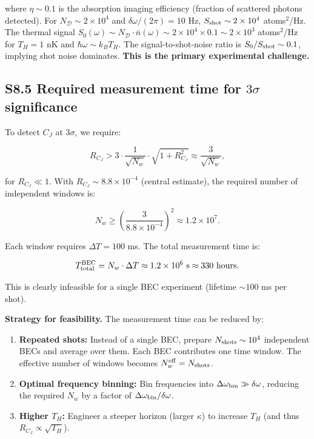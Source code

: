 \documentclass[prd,aps,showpacs,superscriptaddress,twocolumn]{revtex4-2}
\begin{document}
where $\eta \sim 0.1$ is the absorption imaging efficiency (fraction of scattered photons detected). For $N_{\mathcal{D}} \sim 2 \times 10^4$ and $\delta\omega/(2\pi) = 10$ Hz, $S_{\rm shot} \sim 2 \times 10^4$ atoms$^2$/Hz. The thermal signal $S_0(\omega) \sim N_{\mathcal{D}} \cdot \bar{n}(\omega) \sim 2 \times 10^4 \times 0.1 \sim 2 \times 10^3$ atoms$^2$/Hz for $T_H = 1$ nK and $\hbar\omega \sim k_B T_H$. The signal-to-shot-noise ratio is $S_0 / S_{\rm shot} \sim 0.1$, implying shot noise dominates. \textbf{This is the primary experimental challenge.}

\subsection{S8.5 Required measurement time for $3\sigma$ significance}

To detect $C_J$ at $3\sigma$, we require:

\begin{equation}
R_{C_J} > 3 \cdot \frac{1}{\sqrt{N_w}} \cdot \sqrt{1 + R_{C_J}^2} \approx \frac{3}{\sqrt{N_w}},
\label{eq:3sigma_CJ}
\end{equation}

for $R_{C_J} \ll 1$. With $R_{C_J} \sim 8.8 \times 10^{-4}$ (central estimate), the required number of independent windows is:

\begin{equation}
N_w \geq \left( \frac{3}{8.8 \times 10^{-4}} \right)^2 \approx 1.2 \times 10^7.
\label{eq:Nw_required}
\end{equation}

Each window requires $\Delta T = 100$ ms. The total measurement time is:

\begin{equation}
T_{\rm total}^{\rm BEC} = N_w \cdot \Delta T \approx 1.2 \times 10^6\ {\rm s} \approx 330\ {\rm hours}.
\label{eq:BEC_time_central}
\end{equation}

This is clearly infeasible for a single BEC experiment (lifetime $\sim 100$ ms per shot).

\textbf{Strategy for feasibility.} The measurement time can be reduced by:

\begin{enumerate}
    \item \textbf{Repeated shots:} Instead of a single BEC, prepare $N_{\rm shots} \sim 10^4$ independent BECs and average over them. Each BEC contributes one time window. The effective number of windows becomes $N_w^{\rm eff} = N_{\rm shots}$.
    \item \textbf{Optimal frequency binning:} Bin frequencies into $\Delta\omega_{\rm bin} \gg \delta\omega$, reducing the required $N_w$ by a factor of $\Delta\omega_{\rm bin}/\delta\omega$.
    \item \textbf{Higher $T_H$:} Engineer a steeper horizon (larger $\kappa$) to increase $T_H$ (and thus $R_{C_J} \propto \sqrt{T_H}$).
\end{enumerate}
\end{document}
